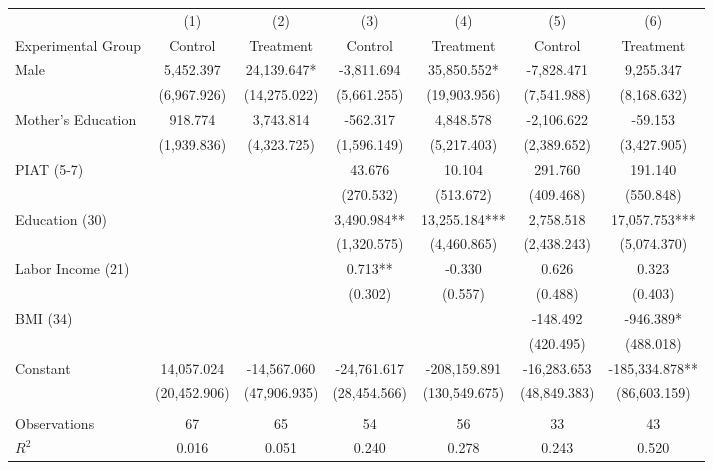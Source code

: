 \begin{tabular}{lcccccc} \bottomrule
 & (1) & (2) & (3) & (4) & (5) & (6) \\
Experimental Group & Control & Treatment & Control & Treatment  & Control & Treatment \\ \midrule
Male & 5,452.397 & 24,139.647* & -3,811.694 & 35,850.552* & -7,828.471 & 9,255.347 \\
 & (6,967.926) & (14,275.022) & (5,661.255) & (19,903.956) & (7,541.988) & (8,168.632) \\
Mother's Education & 918.774 & 3,743.814 & -562.317 & 4,848.578 & -2,106.622 & -59.153 \\
 & (1,939.836) & (4,323.725) & (1,596.149) & (5,217.403) & (2,389.652) & (3,427.905) \\
PIAT (5-7) &  &  & 43.676 & 10.104 & 291.760 & 191.140 \\
 &  &  & (270.532) & (513.672) & (409.468) & (550.848) \\
Education (30) &  &  & 3,490.984** & 13,255.184*** & 2,758.518 & 17,057.753*** \\
 &  &  & (1,320.575) & (4,460.865) & (2,438.243) & (5,074.370) \\
Labor Income (21) &  &  & 0.713** & -0.330 & 0.626 & 0.323 \\
 &  &  & (0.302) & (0.557) & (0.488) & (0.403) \\
BMI (34) &  &  &  &  & -148.492 & -946.389* \\
 &  &  &  &  & (420.495) & (488.018) \\
Constant & 14,057.024 & -14,567.060 & -24,761.617 & -208,159.891 & -16,283.653 & -185,334.878** \\
 & (20,452.906) & (47,906.935) & (28,454.566) & (130,549.675) & (48,849.383) & (86,603.159) \\ \\ \midrule
 Observations & 67 & 65 & 54 & 56 & 33 & 43 \\
$R^2$ & 0.016 & 0.051 & 0.240 & 0.278 & 0.243 & 0.520 \\ \bottomrule
\end{tabular}
